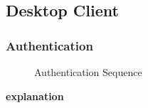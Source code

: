 \subsection{Desktop Client}

\subsubsection{Authentication}
\begin{figure}[hb]
    \centering
    \caption{Authentication Sequence}
    \label{fig:seq-desktop-auth}
\end{figure}

\textbf{explanation}
\newpage


